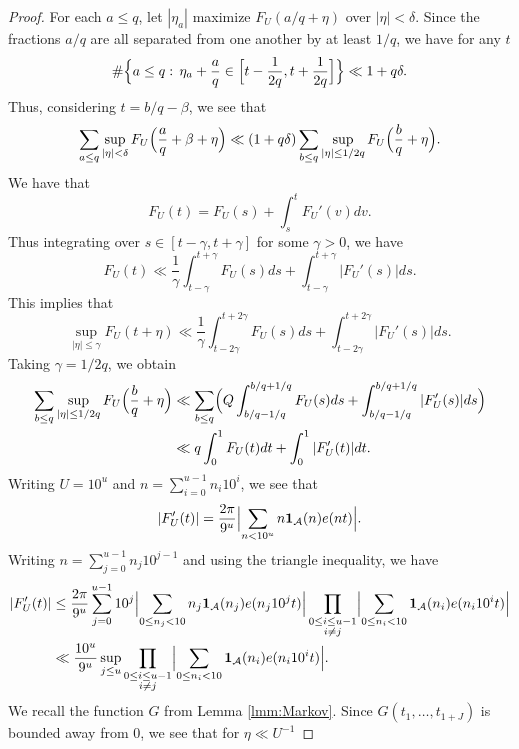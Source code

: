 \documentclass[10pt]{amsart}
\theoremstyle{plain}
\numberwithin{sblmm}{thrm}
\numberwithin{equation}{section}
\begin{document}
\begin{proof}
%
For each $a\le q$, let $|\eta_{a}|$ maximize $F_U(a/q+\eta)$ over $|\eta|<\delta$. Since the fractions $a/q$ are all separated from one another by at least $1/q$, we have for any $t$
\[
\#\Bigl\{a\le q:\,\eta_a+\frac{a}{q}\in \Bigl[t-\frac{1}{2q},t+\frac{1}{2q}\Bigr]\Bigr\}\ll 1+q\delta.
\]
Thus, considering $t=b/q-\beta$, we see that
\begin{equation}
\sum_{a\le q}\sup_{|\eta|<\delta}F_{U}\Bigl(\frac{a}{q}+\beta+\eta\Bigr)\ll (1+q\delta)\sum_{b\le q}\sup_{|\eta|\le 1/2q}F_{U}\Bigl(\frac{b}{q}+\eta\Bigr).
\label{eq:DeltaBound}
\end{equation}
We have that
\[
F_{U}(t)=F_{U}(s)+\int_s^t F_{U}'(v)d v.
\]
Thus integrating over $s\in [t-\gamma,t+\gamma]$ for some $\gamma>0$,  we have
\[
F_{U}(t)\ll \frac{1}{\gamma}\int_{t-\gamma}^{t+\gamma}F_{U}(s)d s+\int_{t-\gamma}^{t+\gamma}|F_{U}'(s)|d s.
\]
This implies that
\begin{equation*}
\sup_{|\eta|\le \gamma}F_U(t+\eta)\ll \frac{1}{\gamma}\int_{t-2\gamma}^{t+2\gamma}F_U(s)ds+\int_{t-2\gamma}^{t+2\gamma}|F_U'(s)|ds.
\end{equation*}
Taking $\gamma=1/2q$, we obtain
\begin{align}
\sum_{b\le q}\sup_{|\eta|\le 1/2q}F_{U}\Bigl(\frac{b}{q}+\eta\Bigr)&\ll \sum_{b\le q}\Bigl(Q\int_{b/q-1/q}^{b/q+1/q}F_U(s)d s+\int_{b/q-1/q}^{b/q+1/q}|F'_U(s)|d s\Bigr)\nonumber \\
&\ll q\int_0^1F_{U}(t)d t+\int_{0}^{1}|F_{U}'(t)|d t.
\label{eq:GallagherBound}
\end{align}
Writing $U=10^u$ and $n=\sum_{i=0}^{u-1}n_i 10^i$, we see that
\[
|F_{U}'(t)|=\frac{2\pi}{9^{u}}\Bigl|\sum_{n< 10^u} n\mathbf{1}_{\mathcal{A}}(n)e(n t)\Bigr|.
\]
Writing $n=\sum_{j=0}^{u-1}n_j10^{j-1}$ and using the triangle inequality, we have
%
\begin{align*}
|F_U'(t)|&\le \frac{2\pi }{ 9^{u}}\sum_{j=0}^{u-1}10^j\Bigl|\sum_{0\le n_j<10}n_j\mathbf{1}_{\mathcal{A}}(n_j)e(n_j 10^{j}t)\Bigr|\prod_{\substack{0\le i\le u-1\\ i\ne j}}\Bigl|\sum_{0\le n_i<10}\mathbf{1}_{\mathcal{A}}(n_i)e(n_i 10^i t)\Bigr|\\
&\ll \frac{10^u}{9^u}\sup_{j\le u}\prod_{\substack{0\le i\le u-1\\ i\ne j}}\Bigl|\sum_{0\le n_i<10}\mathbf{1}_{\mathcal{A}}(n_i)e(n_i 10^i t)\Bigr|.
\end{align*}
%
We recall the function $G$ from Lemma \ref{lmm:Markov}. Since $G(t_1,\dots,t_{1+J})$ is bounded away from 0, we see that for $\eta\ll U^{-1}$

\end{proof}
\end{document}
